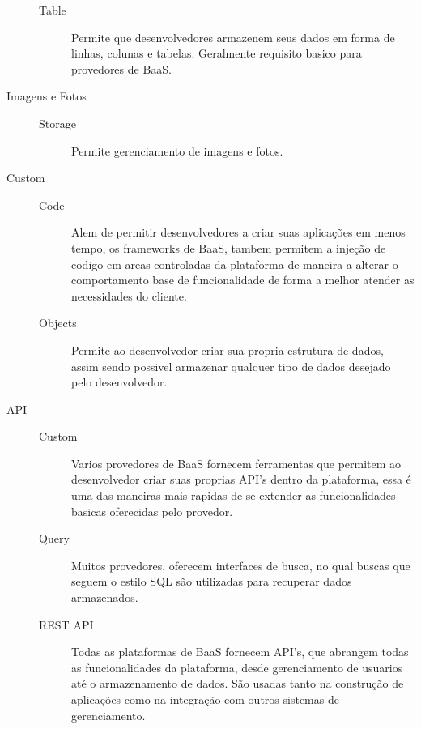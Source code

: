 \begin{description}
\begin{description}
				\item[Table] { Permite que desenvolvedores armazenem seus dados em forma de linhas, colunas e tabelas. Geralmente requisito basico para provedores de BaaS.}

			\end{description}
		
		\item[Imagens e Fotos]
			\begin{description}
            	\item [] 
				\item[Storage] { Permite gerenciamento de imagens e fotos.}
			\end{description}
		

		\item[Custom]
			\begin{description}
            	\item[]
				\item[Code] { Alem de permitir desenvolvedores a criar suas aplicações em menos tempo, os frameworks de BaaS, tambem permitem a injeção de codigo em areas controladas da plataforma de maneira a alterar o comportamento base de funcionalidade de forma a melhor atender as necessidades do cliente.}

				\item[Objects] { Permite ao desenvolvedor criar sua propria estrutura de dados, assim sendo possivel armazenar qualquer tipo de dados desejado pelo desenvolvedor. }
			\end{description}
	

		\item[API]
			\begin{description}
            	\item[]
				\item[Custom] { Varios provedores de BaaS fornecem ferramentas que permitem ao desenvolvedor criar suas proprias API's dentro da plataforma, essa é uma das maneiras mais rapidas de se extender as funcionalidades basicas oferecidas pelo provedor. }

				\item[Query] { Muitos provedores, oferecem interfaces de busca, no qual buscas que seguem o estilo SQL são utilizadas para recuperar dados armazenados. }

				\item[REST API] { Todas as plataformas de BaaS fornecem API's, que abrangem todas as funcionalidades da plataforma, desde gerenciamento de usuarios até o armazenamento de dados. São usadas tanto na construção de aplicações como na integração com outros sistemas de gerenciamento. }
			\end{description}
		

\end{description}
